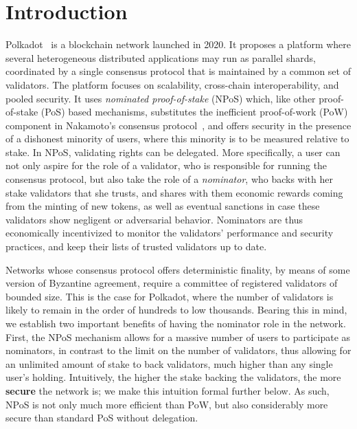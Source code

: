 \section{Introduction}

Polkadot~\cite{burdges2020overview} is a blockchain network launched in 2020. It proposes a platform where several heterogeneous distributed applications may run as parallel shards, coordinated by a single consensus protocol that is maintained by a common set of validators. The platform focuses on scalability, cross-chain interoperability, and pooled security. 
It uses \emph{nominated proof-of-stake} (NPoS) which, like other proof-of-stake (PoS) based mechanisms, 
substitutes the inefficient proof-of-work (PoW) component in Nakamoto’s consensus protocol~\cite{nakamoto2019bitcoin}, 
and offers security in the presence of a dishonest minority of users, where this minority is to be measured relative to stake. 
In NPoS, validating rights can be delegated. More specifically, a user can not only aspire for the role of a validator, who is responsible for running the consensus protocol, 
but also take the role of a \emph{nominator}, who backs with her stake validators that she trusts, 
and shares with them economic rewards coming from the minting of new tokens, as well as eventual sanctions in case these validators show negligent or adversarial behavior.  
Nominators are thus economically incentivized to monitor the validators' performance and security practices, and keep their lists of trusted validators up to date.

Networks whose consensus protocol offers deterministic finality, by means of some version of Byzantine agreement, require a committee of registered validators of bounded size. This is the case for Polkadot, where the number of validators is likely to remain in the order of hundreds to low thousands. 
Bearing this in mind, we establish two important benefits of having the nominator role in the network. 
First, the NPoS mechanism allows for a massive number of users to participate as nominators, in contrast to the limit on the number of validators, thus allowing for an unlimited amount of stake to back validators, much higher than any single user's holding. Intuitively, the higher the stake backing the validators, the more \textbf{secure} the network is; we make this intuition formal further below. As such, NPoS is not only much more efficient than PoW, but also considerably more secure than standard PoS without delegation.

